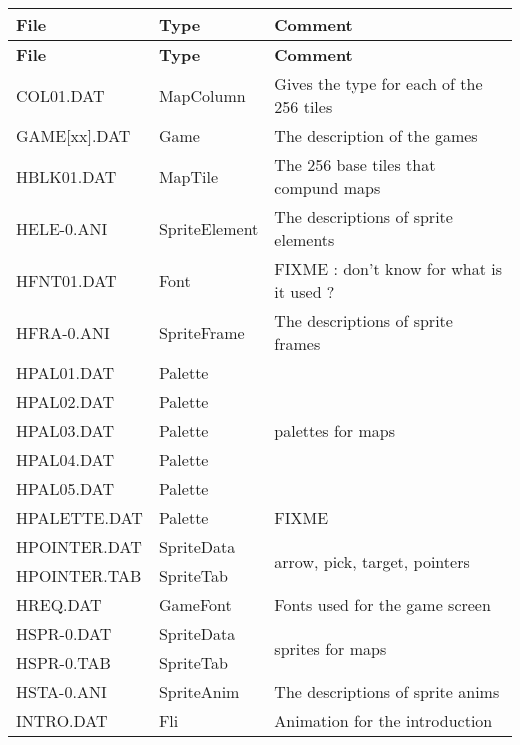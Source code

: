 \documentclass[a4paper,twoside,12pt,dvips]{article}
\begin{document}
\begin{center}
  \begin{longtable}{|l|l|l|}

    \hline \textbf{File} & \textbf{Type} & \textbf{Comment} \\ \hline 
    \endfirsthead

    \hline \textbf{File} & \textbf{Type} & \textbf{Comment} \\ \hline 
    \endhead

    COL01.DAT    & MapColumn     & Gives the type for each of the 256 tiles \\
    \hline
    GAME[xx].DAT & Game          & The description of the games \\
    \hline
    HBLK01.DAT   & MapTile       & The 256 base tiles that compund maps \\
    \hline
    HELE-0.ANI   & SpriteElement & The descriptions of sprite elements \\
    \hline
    HFNT01.DAT   & Font          & FIXME : don't know for what is it used ?\\
    \hline
    HFRA-0.ANI   & SpriteFrame   & The descriptions of sprite frames \\
    \hline
    HPAL01.DAT   & Palette       & \multirow{5}{*}{palettes for maps} \\ 
    \cline{1-2}
    HPAL02.DAT   & Palette       & ~ \\ 
    \cline{1-2}
    HPAL03.DAT   & Palette       & ~ \\ 
    \cline{1-2}
    HPAL04.DAT   & Palette       & ~ \\ 
    \cline{1-2}
    HPAL05.DAT   & Palette       & ~ \\ 
    \hline
    HPALETTE.DAT & Palette       & FIXME \\
    \hline
    HPOINTER.DAT & SpriteData    & \multirow{2}{*}{arrow, pick, target, pointers} \\
    \cline{1-2}
    HPOINTER.TAB & SpriteTab     & ~ \\ 
    \hline
    HREQ.DAT     & GameFont      & Fonts used for the game screen \\
    \hline
    HSPR-0.DAT   & SpriteData    & \multirow{2}{*}{sprites for maps} \\
    \cline{1-2}
    HSPR-0.TAB   & SpriteTab     & ~ \\ 
    \hline
    HSTA-0.ANI   & SpriteAnim    & The descriptions of sprite anims \\
    \hline
    INTRO.DAT    & Fli           & Animation for the introduction \\

\end{longtable}
\end{center}
\end{document}
